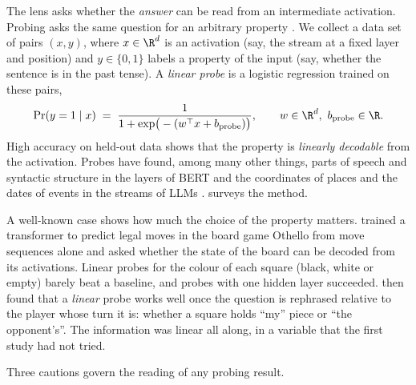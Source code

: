 The lens asks whether the \emph{answer} can be read from an intermediate activation. Probing asks the same
question for an arbitrary property \citep{alain2017understanding}. We collect a data set of pairs $(x,y)$,
where $x\in\R^d$ is an activation (say, the stream at a fixed layer and position) and $y\in\{0,1\}$ labels a
property of the input (say, whether the sentence is in the past tense). A \emph{linear probe} is a logistic
regression trained on these pairs,
\begin{equation}\label{eq:probe}
\Pr(y=1\mid x) \;=\; \frac{1}{1+\exp\!\big(-(w^\top x+b_{\mathrm{probe}})\big)},\qquad w\in\R^d,\ b_{\mathrm{probe}}\in\R .
\end{equation}
High accuracy on held-out data shows that the property is \emph{linearly decodable} from the activation.
Probes have found, among many other things, parts of speech and syntactic structure in the layers of BERT
\citep{tenney2019bert,hewitt2019structural} and the coordinates of places and the dates of events in the streams
of LLMs \citep{gurnee2024language}. \citet{belinkov2022probing} surveys the method.

A well-known case shows how much the choice of the property matters. \citet{li2023emergent} trained a
transformer to predict legal moves in the board game Othello from move sequences alone and asked whether the
state of the board can be decoded from its activations. Linear probes for the colour of each square (black,
white or empty) barely beat a baseline, and probes with one hidden layer succeeded. \citet{nanda2023emergent}
then found that a \emph{linear} probe works well once the question is rephrased relative to the player whose
turn it is: whether a square holds ``my'' piece or ``the opponent's''. The information was linear all along, in
a variable that the first study had not tried.

Three cautions govern the reading of any probing result.

